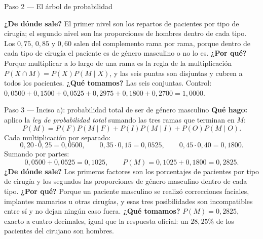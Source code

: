 \documentclass[11pt]{article}
\begin{document}
\begin{sol}
\begin{paso}{Paso 2 --- El árbol de probabilidad}
\begin{center}
\shorthandon{<>}
\end{center}

\textbf{¿De dónde sale?} El primer nivel son los repartos de pacientes por tipo de cirugía; el segundo nivel son las proporciones de hombres dentro de cada tipo. Los $0,75$, $0,85$ y $0,60$ salen del complemento rama por rama, porque dentro de cada tipo de cirugía el paciente es de género masculino o no lo es.
\textbf{¿Por qué?} Porque multiplicar a lo largo de una rama es la regla de la multiplicación $P(X\cap M)=P(X)P(M\mid X)$, y las seis puntas son disjuntas y cubren a todos los pacientes.
\textbf{¿Qué tomamos?} Las seis conjuntas. Control: $0,0500+0,1500+0,0525+0,2975+0,1800+0,2700=1,0000$.
\end{paso}

\begin{paso}{Paso 3 --- Inciso a): probabilidad total de ser de género masculino}
\textbf{Qué hago:} aplico la \emph{ley de probabilidad total} sumando las tres ramas que terminan en $M$:
\[
P(M)=P(F)P(M\mid F)+P(I)P(M\mid I)+P(O)P(M\mid O).
\]
Cada multiplicación por separado:
\[
0,20\cdot 0,25=0,0500,\qquad 0,35\cdot 0,15=0,0525,\qquad 0,45\cdot 0,40=0,1800 .
\]
Sumando por partes:
\[
0,0500+0,0525=0,1025,\qquad P(M)=0,1025+0,1800=0,2825 .
\]
\textbf{¿De dónde sale?} Los primeros factores son los porcentajes de pacientes por tipo de cirugía y los segundos las proporciones de género masculino dentro de cada tipo.
\textbf{¿Por qué?} Porque un paciente masculino se realizó correcciones faciales, implantes mamarios u otras cirugías, y esas tres posibilidades son incompatibles entre sí y no dejan ningún caso fuera.
\textbf{¿Qué tomamos?} $P(M)=0,2825$, exacto a cuatro decimales, igual que la respuesta oficial: un $28,25\%$ de los pacientes del cirujano son hombres.
\end{paso}


\end{sol}
\end{document}
